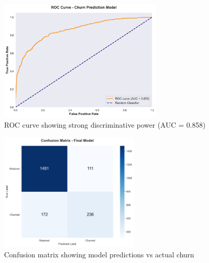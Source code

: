 \documentclass[12pt]{article}
\begin{document}
\begin{figure}[H]
\centering
\includegraphics[width=0.7\textwidth]{img/17_roc_curve.png}
\caption{ROC curve showing strong discriminative power (AUC = 0.858)}
\label{fig:roc}
\end{figure}

\begin{figure}[H]
\centering
\includegraphics[width=0.6\textwidth]{img/16_confusion_matrix.png}
\caption{Confusion matrix showing model predictions vs actual churn}
\label{fig:confusion}
\end{figure}
\end{document}
